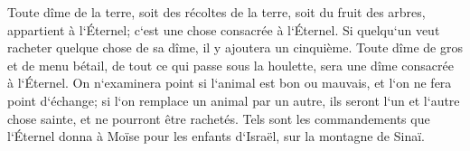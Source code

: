 \verse Toute dîme de la terre, soit des récoltes de la terre, soit du fruit des arbres, appartient à l`Éternel; c`est une chose consacrée à l`Éternel. 
\verse Si quelqu`un veut racheter quelque chose de sa dîme, il y ajoutera un cinquième. 
\verse Toute dîme de gros et de menu bétail, de tout ce qui passe sous la houlette, sera une dîme consacrée à l`Éternel. 
\verse On n`examinera point si l`animal est bon ou mauvais, et l`on ne fera point d`échange; si l`on remplace un animal par un autre, ils seront l`un et l`autre chose sainte, et ne pourront être rachetés. 
\verse Tels sont les commandements que l`Éternel donna à Moïse pour les enfants d`Israël, sur la montagne de Sinaï. 
